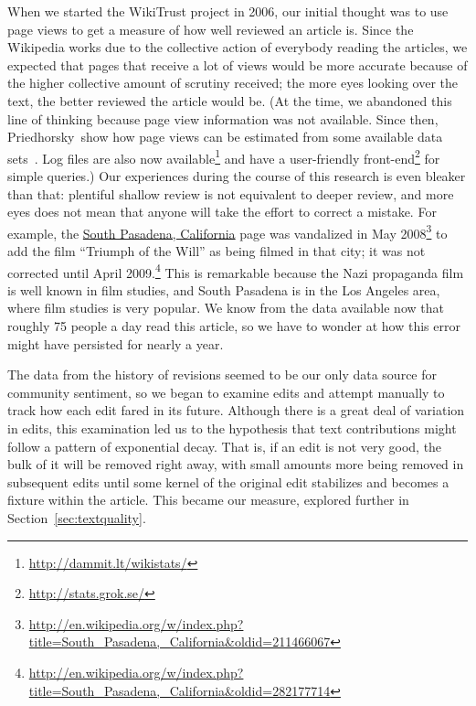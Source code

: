 When we started the WikiTrust project in 2006, our initial thought was to
use page views to get a measure of how well reviewed an article is.
Since the Wikipedia works due to the collective action of everybody
reading the articles, we expected that pages that receive a lot of
views would be more accurate because of the higher collective amount
of scrutiny received; the more eyes looking over the text, the better
reviewed the article would be.
(At the time, we abandoned this line of thinking because page view
information was not available.
Since then, Priedhorsky~\etal show how page views can be estimated
from some available data sets~\cite{Priedhorsky2007}.
Log files are also now
available\footnote{\url{http://dammit.lt/wikistats/}} and
have a user-friendly front-end\footnote{\url{http://stats.grok.se/}}
for simple queries.)
Our experiences during the course of this research is even
bleaker than that: plentiful shallow review is not equivalent to
deeper review, and more eyes does not mean that anyone will take
the effort to correct a mistake.
For example, the \underline{South Pasadena, California} page was vandalized
in May 2008\footnote{\url{http://en.wikipedia.org/w/index.php?title=South_Pasadena,_California&oldid=211466067}}
to add the film ``Triumph of the Will'' as being filmed in that city;
it was not corrected until
April 2009.\footnote{\url{http://en.wikipedia.org/w/index.php?title=South_Pasadena,_California&oldid=282177714}}
This is remarkable because the Nazi propaganda film is well known in film studies,
and South Pasadena is in the Los Angeles area,
where film studies is very popular.
We know from the data available now that roughly 75 people a day
read this article, so we have to wonder at how this error might
have persisted for nearly a year.

The data from the history of revisions seemed to be our only
data source for community sentiment, so
we began to examine edits and attempt manually to track how each
edit fared in its future.
Although there is a great deal of variation in edits, this examination
led us to the hypothesis that text contributions might follow a pattern
of exponential decay.
That is, if an edit is not very good, the bulk of it will be removed
right away, with small amounts more being removed in subsequent edits
until some kernel of the original edit stabilizes and becomes a fixture
within the article.
This became our  measure, explored further in
Section~\ref{sec:textquality}.

